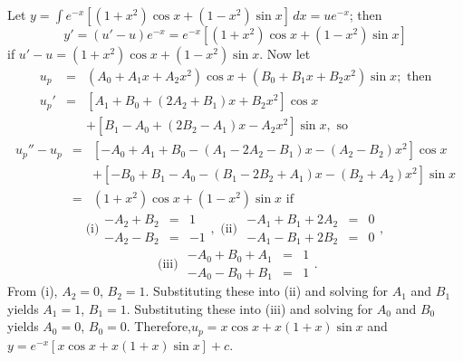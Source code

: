\documentclass{ximera}
\begin{document}
\begin{problem}
\begin{enumerate}
\begin{solution}
    Let $y=\int e^{-x}\left[(1+x^2)\cos x+(1-x^2)\sin
x\right]\,dx =ue^{-x}$; then $$
y'=(u'-u)e^{-x}=e^{-x}\left[(1+x^2)\cos x+(1-x^2)\sin x\right] $$ if
$u'-u=(1+x^2)\cos x+(1-x^2)\sin x$. Now let \begin{eqnarray*}
u_p&=&(A_0+A_1x+A_2x^2)\cos x +(B_0+B_1x+B_2x^2)\sin x;\mbox{ then}\\
u_p'&=&\left[A_1+B_0+(2A_2+B_1)x+B_2x^2\right]\cos x\\ &&
+\left[B_1-A_0+(2B_2-A_1)x-A_2x^2\right]\sin x, \mbox{ so}
\end{eqnarray*} \begin{eqnarray*}
u_p''-u_p&=&\left[-A_0+A_1+B_0-(A_1-2A_2-B_1)x-(A_2-B_2)x^2\right]\cos
x\\ && +\left[-B_0+B_1-A_0-(B_1-2B_2+A_1)x-(B_2+A_2)x^2\right]\sin x\\
&=& (1+x^2)\cos x+(1-x^2)\sin x \mbox{ if} \end{eqnarray*} $$
\mbox{(i)} \begin{array}{rcr} -A_2+B_2&=&1\\ -A_2-B_2&=&-1
\end{array}, \mbox{ (ii) } \begin{array}{rcr} -A_1+B_1+2A_2&=&0\\
-A_1-B_1+2B_2&=&0\end{array}, $$ $$ \mbox{ (iii) } \begin{array}{rcl}
-A_0+B_0+A_1&=&1\\ -A_0-B_0+B_1&=&1 \end{array}. $$ From (i), $A_2=0$,
$B_2=1$. Substituting these into (ii) and solving for $A_1$ and $B_1$
yields $A_1=1$, $B_1=1$. Substituting these into (iii) and solving for
$A_0$ and $B_0$ yields $A_0=0$, $B_0=0$. Therefore,$u_p=x\cos
x+x(1+x)\sin x$ and $y=e^{-x}\left[x\cos x+x(1+x)\sin x\right]+c$.

\end{solution}
\end{enumerate}
\end{problem}
\end{document}
